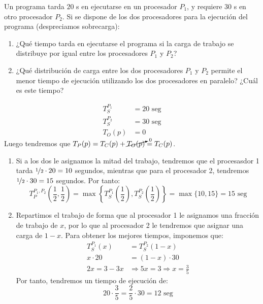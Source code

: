 \begin{ejercicio}
    Un programa tarda $20$ s en ejecutarse en un procesador $P_1$, y requiere $30$ s en otro procesador
    $P_2$. Si se dispone de los dos procesadores para la ejecución del programa (despreciamos sobrecarga):
    \begin{enumerate}
        \item ¿Qué tiempo tarda en ejecutarse el programa si la carga de trabajo se distribuye por igual entre los
        procesadores $P_1$ y $P_2$?
        \item ¿Qué distribución de carga entre los dos procesadores $P_1$ y $P_2$ permite el menor tiempo de
        ejecución utilizando los dos procesadores en paralelo? ¿Cuál es este tiempo?
    \end{enumerate}


    \begin{align*}
        T_S^{P_1} &= 20 \text{\ seg} \\
        T_S^{P_2} &= 30 \text{\ seg} \\
        T_O(p) &= 0
    \end{align*}
    Luego tendremos que $T_P(p) = T_C(p) + \cancelto{0}{T_O(p)} = T_C(p)$.

    \begin{enumerate}
        \item 
            Si a los dos le asignamos la mitad del trabajo, tendremos que el procesasdor 1 tarda $\nicefrac{1}{2}\cdot 20 = 10$ segundos, mientras que para el procesador 2, tendremos $\nicefrac{1}{2}\cdot 30 = 15$ segundos. Por tanto:
            \begin{equation}
                T_P^{P_1, P_2}\left(\frac{1}{2}, \frac{1}{2}\right) = \max\left\{T_S^{P_1}\left(\frac{1}{2}\right), T_S^{P_2}\left(\frac{1}{2}\right)\right\} = \max\{10, 15\} = 15 \text{\ seg}
            \end{equation}

        \item 
        Repartimos el trabajo de forma que al procesador 1 le asignamos una fracción de trabajo de $x$, por lo que al procesador 2 le tendremos que asignar una carga de $1-x$. Para obtener los mejores tiempos, imponemos que:
        \begin{align*}
            T_S^{P_1}(x) &= T_S^{P_2}(1-x) \\
            x\cdot 20 &= (1-x)\cdot 30 \\
            2x = 3-3x &\Longrightarrow 5x=3 \Longrightarrow x = \frac{3}{5}
        \end{align*}
        Por tanto, tendremos un tiempo de ejecución de:
        \begin{equation*}
            20\cdot \frac{3}{5} = \frac{2}{5}\cdot 30 = 12 \text{\ seg}
        \end{equation*}
    \end{enumerate}

    

\end{ejercicio}

